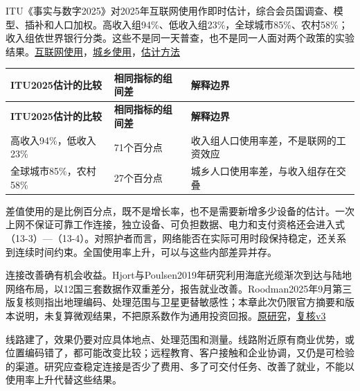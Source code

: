\documentclass[UTF8,fontset=windows,12pt,a4paper,oneside,openany]{ctexbook}
\begin{document}
ITU《事实与数字2025》对2025年互联网使用作即时估计，综合会员国调查、模型、插补和人口加权。高收入组94\%、低收入组23\%，全球城市85\%、农村58\%；收入组依世界银行分类。这些不是同一天普查，也不是同一人面对两个政策的实验结果。\href{https://www.itu.int/itu-d/reports/statistics/2025/10/15/ff25-internet-use/}{互联网使用}，\href{https://www.itu.int/itu-d/reports/statistics/2025/10/15/ff25-internet-use-in-urban-and-rural-areas/}{城乡使用}，\href{https://www.itu.int/itu-d/reports/statistics/2025/10/15/ff25-methodology/}{估计方法}

\begingroup\footnotesize\setlength{\tabcolsep}{4pt}\renewcommand{\arraystretch}{1.25}
\begin{longtable}{>{\raggedright\arraybackslash}p{}>{\raggedright\arraybackslash}p{}>{\raggedright\arraybackslash}p{}}
\toprule
\textbf{ITU2025估计的比较} & \textbf{相同指标的组间差} & \textbf{解释边界} \\
\midrule\endfirsthead
\toprule
\textbf{ITU2025估计的比较} & \textbf{相同指标的组间差} & \textbf{解释边界} \\
\midrule\endhead
\bottomrule\endfoot
高收入94\%，低收入23\% & 71个百分点 & 收入组人口使用率差，不是联网的工资效应 \\
全球城市85\%，农村58\% & 27个百分点 & 城乡人口使用率差，与收入组存在交叠 \\
\end{longtable}\endgroup


差值使用的是比例百分点，既不是增长率，也不是需要新增多少设备的估计。一次上网不保证可靠工作连接，独立设备、可负担数据、电力和支付资格还会进入式（13-3）—（13-4）。对照护者而言，网络能否在实际可用时段保持稳定，还关系到连续时间约束。全国使用率上升，可以与这些内部差异并存。

连接改善确有机会收益。Hjort与Poulsen2019年研究利用海底光缆渐次到达与陆地网络布局，以12国三套数据作双重差分，报告就业改善。Roodman2025年9月第三版复核则指出地理编码、处理范围与卫星更替敏感性；本章此次仍限官方摘要和版本说明，未复算微观结果，不把原系数作为通用投资回报。\href{https://www.aeaweb.org/articles?id=10.1257/aer.20161385}{原研究}，\href{https://arxiv.org/abs/2401.13694v3}{复核v3}

线路建了，效果仍要对应具体地点、处理范围和测量。线路附近原有商业优势，或位置编码错了，都可能改变比较；远程教育、客户接触和企业协调，又仍是可检验的渠道。研究应查稳定连接是否少了费用、多了可交付任务、改善了就业，不能以使用率上升代替这些结果。
\end{document}
